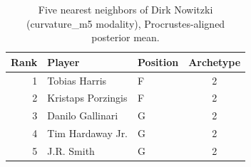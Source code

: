 \begin{table}[htbp]
  \centering\small
  \begin{tabular}{rllc}
    \toprule
    Rank & Player & Position & Archetype \\
    \midrule
    1 & Tobias Harris & F & 2 \\
    2 & Kristaps Porzingis & F & 2 \\
    3 & Danilo Gallinari & G & 2 \\
    4 & Tim Hardaway Jr. & G & 2 \\
    5 & J.R. Smith & G & 2 \\
    \bottomrule
  \end{tabular}
  \caption{Five nearest neighbors of Dirk Nowitzki (curvature_m5 modality), Procrustes-aligned posterior mean.}
  \label{tab:Dirk_Nowitzki_neighbors_curvature_m5}
\end{table}

